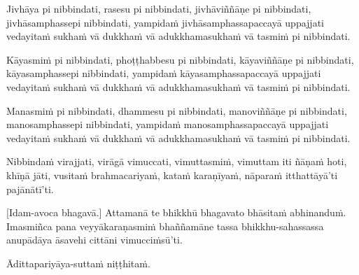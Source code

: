 Jivhāya pi nibbindati, rasesu pi nibbindati, jivhāviññāṇe pi nibbindati,
jivhāsamphassepi nibbindati, yampidaṁ jivhāsamphassapaccayā uppajjati
vedayitaṁ sukhaṁ vā dukkhaṁ vā adukkhamasukhaṁ vā tasmiṁ pi nibbindati.

Kāyasmiṁ pi nibbindati, phoṭṭhabbesu pi nibbindati, kāyaviññāṇe pi
nibbindati, kāyasamphassepi nibbindati, yampidaṁ kāyasamphassapaccayā
uppajjati vedayitaṁ sukhaṁ vā dukkhaṁ vā adukkhamasukhaṁ vā tasmiṁ pi
nibbindati.

Manasmiṁ pi nibbindati, dhammesu pi nibbindati, manoviññāṇe pi
nibbindati, manosamphassepi nibbindati, yampidaṁ manosamphassapaccayā
uppajjati vedayitaṁ sukhaṁ vā dukkhaṁ vā adukkhamasukhaṁ vā tasmiṁ pi
nibbindati.

Nibbindaṁ virajjati, virāgā vimuccati, vimuttasmiṁ, vimuttam iti ñāṇaṁ
hoti, khīṇā jāti, vusitaṁ brahmacariyaṁ, kataṁ karaṇīyaṁ, nāparaṁ
itthattāyā'ti pajānātī'ti.

\enlargethispage{\baselineskip}

[Idam-avoca bhagavā.] Attamanā te bhikkhū bhagavato bhāsitaṁ abhinanduṁ.
Imasmiñca pana veyyākaraṇasmiṁ bhaññamāne tassa bhikkhu-sahassassa
anupādāya āsavehi cittāni vimucciṁsū'ti.

Ādittapariyāya-suttaṁ niṭṭhitaṁ.

\resumeNormalText

